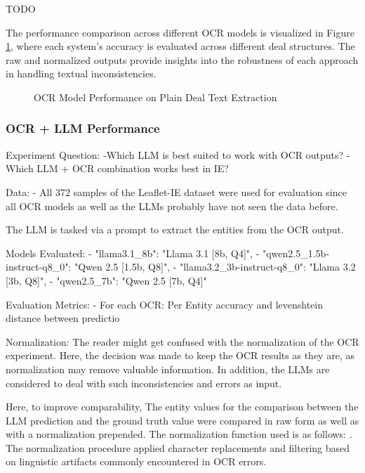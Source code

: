 \documentclass[11pt]{article}
\begin{document}
TODO


The performance comparison across different OCR models is visualized in Figure \ref{fig:ocr_results}, where each system's accuracy is evaluated across different deal structures. The raw and normalized outputs provide insights into the robustness of each approach in handling textual inconsistencies.
\begin{figure}[h]
    \centering
    \caption{OCR Model Performance on Plain Deal Text Extraction}
    \label{fig:ocr_results}
\end{figure}


\subsubsection{OCR + LLM Performance}
Experiment Question: 
-Which LLM is best suited to work with OCR outputs?
-Which LLM + OCR combination works best in IE?


Data:
- All 372 samples of the Leaflet-IE dataset were used for evaluation since all OCR models as well as the LLMs probably have not seen the data before.

The LLM is tasked via a prompt to extract the entities from the OCR output. 


Models Evaluated:
-    "llama3.1_8b": "Llama 3.1 [8b, Q4]",
-    "qwen2.5_1.5b-instruct-q8_0": "Qwen 2.5 [1.5b, Q8]",
-    "llama3.2_3b-instruct-q8_0": "Llama 3.2 [3b, Q8]",
-    "qwen2.5_7b": "Qwen 2.5 [7b, Q4]"

Evaluation Metrics:
- For each OCR: Per Entity accuracy and levenshtein distance between predictio

Normalization:
The reader might get confused with the normalization of the OCR experiment. Here, the decision was made to keep the OCR results as they are, as normalization may remove valuable information. In addition, the LLMs are considered to deal with such inconsistencies and errors as input.

Here, to improve comparability, The entity values for the comparison between the LLM prediction and the ground truth value were compared in raw form as well as with a normalization prepended. The normalization function used is as follows:
. The normalization procedure applied character replacements and filtering based on linguistic artifacts commonly encountered in OCR errors.
\end{document}
